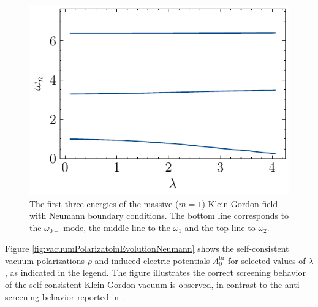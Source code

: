 \begin{figure}
    \centering
    \includegraphics[width=0.75\linewidth]{figures/neumann/eigenvalues.pdf}
    \caption{The first three energies of the massive ($m=1$) Klein-Gordon field with Neumann boundary conditions. The bottom line corresponds to the $\omega_{0+}$ mode, the middle line to the $\omega_1$ and the top line to $\omega_2$.}
    \label{fig:neumann-eigenvalues evolution.}
\end{figure}

Figure \ref{fig:vacuumPolarizatoinEvolutionNeumann} shows the self-consistent vacuum polarizations $\rho$ and induced electric potentials $A_0^\text{br}$ for selected values of $\lambda$, as indicated in the legend. The figure illustrates the correct screening behavior of the self-consistent Klein-Gordon vacuum is observed, in contrast to the anti-screening behavior reported in \cite{Ambj1983}. 

